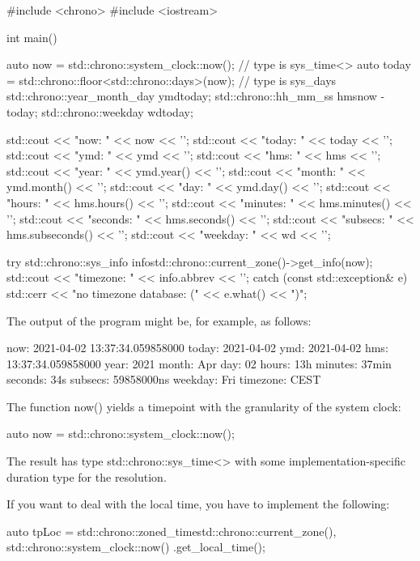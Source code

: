 
\begin{cpp}
#include <chrono>
#include <iostream>

int main()
{
	auto now = std::chrono::system_clock::now(); // type is sys_time<>
	auto today = std::chrono::floor<std::chrono::days>(now); // type is sys_days
	std::chrono::year_month_day ymd{today};
	std::chrono::hh_mm_ss hms{now - today};
	std::chrono::weekday wd{today};
	
	std::cout << "now: " << now << '\n';
	std::cout << "today: " << today << '\n';
	std::cout << "ymd: " << ymd << '\n';
	std::cout << "hms: " << hms << '\n';
	std::cout << "year: " << ymd.year() << '\n';
	std::cout << "month: " << ymd.month() << '\n';
	std::cout << "day: " << ymd.day() << '\n';
	std::cout << "hours: " << hms.hours() << '\n';
	std::cout << "minutes: " << hms.minutes() << '\n';
	std::cout << "seconds: " << hms.seconds() << '\n';
	std::cout << "subsecs: " << hms.subseconds() << '\n';
	std::cout << "weekday: " << wd << '\n';
	
	try {
		std::chrono::sys_info info{std::chrono::current_zone()->get_info(now)};
		std::cout << "timezone: " << info.abbrev << '\n';
	}
	catch (const std::exception& e) {
		std::cerr << "no timezone database: (" << e.what() << ")\n";
	}
}
\end{cpp}

The output of the program might be, for example, as follows:

\begin{shell}
now:      2021-04-02 13:37:34.059858000
today:    2021-04-02
ymd:      2021-04-02
hms:      13:37:34.059858000
year:     2021
month:    Apr
day:      02
hours:    13h
minutes:  37min
seconds:  34s
subsecs:  59858000ns
weekday:  Fri
timezone: CEST
\end{shell}

The function now() yields a timepoint with the granularity of the system clock:

\begin{cpp}
auto now = std::chrono::system_clock::now();
\end{cpp}

The result has type std::chrono::sys\_time<> with some implementation-specific duration type for the resolution.

If you want to deal with the local time, you have to implement the following:

\begin{cpp}
auto tpLoc = std::chrono::zoned_time{std::chrono::current_zone(),
										std::chrono::system_clock::now()
									}.get_local_time();
\end{cpp}

